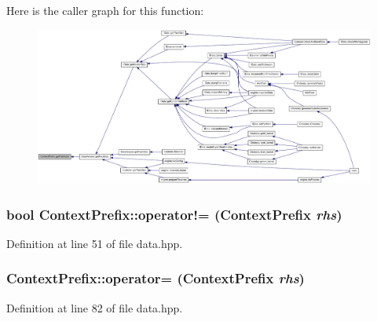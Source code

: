 Here is the caller graph for this function:\nopagebreak
\begin{figure}[H]
\begin{center}
\leavevmode
\includegraphics[width=420pt]{struct_context_prefix_a6d30f468ca52d1dce17ee24804892d52_icgraph}
\end{center}
\end{figure}
\hypertarget{struct_context_prefix_ab1e1301d901aa7c4efeef5927bcdb356}{
\subsubsection[{operator!=}]{\setlength{\rightskip}{0pt plus 5cm}bool ContextPrefix::operator!= ({\bf ContextPrefix} {\em rhs})}}
\label{struct_context_prefix_ab1e1301d901aa7c4efeef5927bcdb356}


Definition at line 51 of file data.hpp.\hypertarget{struct_context_prefix_aeab1c6d784c133599e95d7bf10fdfff6}{
\subsubsection[{operator=}]{ ContextPrefix::operator= ({\bf ContextPrefix} {\em rhs})}}
\label{struct_context_prefix_aeab1c6d784c133599e95d7bf10fdfff6}


Definition at line 82 of file data.hpp.

